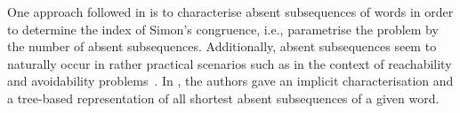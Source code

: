 \documentclass[runningheads,UKenglish,cleveref, autoref, thm-restate]{llncs}
\def\ta{\mathtt{a}}
\begin{document}
One approach followed in \cite{DBLP:journals/tcs/FleischmannHHHMN23,DBLP:journals/fuin/KoscheKMS22} is to characterise absent subsequences of words in order to determine the index of Simon's congruence, i.e., parametrise the problem by the number of absent subsequences. 
Additionally, absent subsequences seem to naturally occur in rather practical scenarios such as in the context of reachability and avoidability problems~\cite{DBLP:journals/fuin/KoscheKMS22}.
In \cite{DBLP:journals/fuin/KoscheKMS22}, the authors gave an implicit characterisation and a tree-based representation of all shortest absent subsequences of a given word.

\medskip
\end{document}
